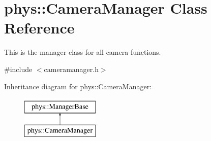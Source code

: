 \hypertarget{classphys_1_1CameraManager}{
\section{phys::CameraManager Class Reference}
\label{d9/d91/classphys_1_1CameraManager}
}


This is the manager class for all camera functions.  




{\ttfamily \#include $<$cameramanager.h$>$}

Inheritance diagram for phys::CameraManager:\begin{figure}[H]
\begin{center}
\leavevmode
\includegraphics[height=2.000000cm]{d9/d91/classphys_1_1CameraManager}
\end{center}
\end{figure}
